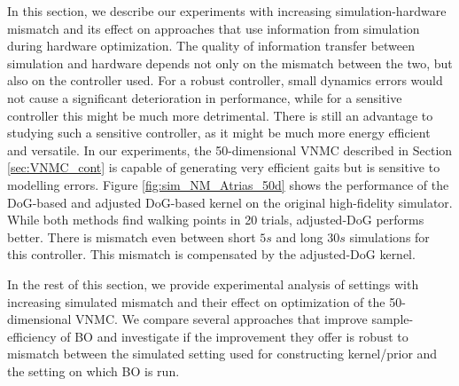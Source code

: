 In this section, we describe our experiments with increasing simulation-hardware mismatch and its effect on approaches that use information from simulation during hardware optimization. The quality of information transfer between simulation and hardware depends not only on the mismatch between the two, but also on the controller used. For a robust controller, small dynamics errors would not cause a significant deterioration in performance, while for a sensitive controller this might be much more detrimental. There is still an advantage to studying such a sensitive controller, as it might be much more energy efficient and versatile. In our experiments, the 50-dimensional VNMC described in Section \ref{sec:VNMC_cont} is capable of generating very efficient gaits but is sensitive to modelling errors. Figure \ref{fig:sim_NM_Atrias_50d} shows the performance of the DoG-based and adjusted DoG-based kernel on the original high-fidelity simulator. While both methods find walking points in 20 trials, adjusted-DoG performs better. There is mismatch even between short $5s$ and long $30s$ simulations for this controller. This mismatch is compensated by the adjusted-DoG kernel.


In the rest of this section, we provide experimental analysis of settings with increasing simulated mismatch and their effect on optimization of the 50-dimensional VNMC. We compare several approaches that improve sample-efficiency of BO and investigate if the improvement they offer is robust to mismatch between the simulated setting used for constructing kernel/prior and the setting on which BO is run. 

